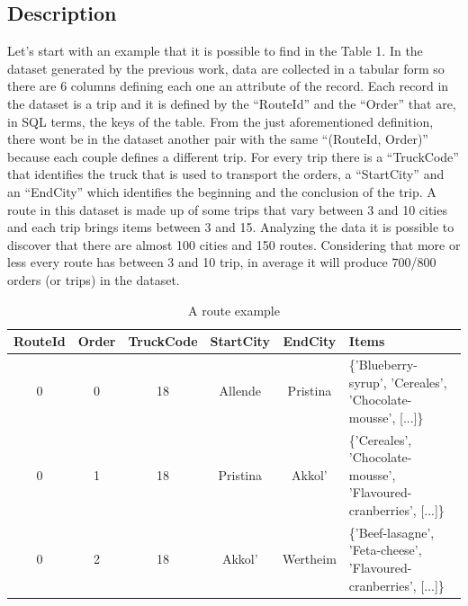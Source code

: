 \documentclass{acm_proc_article-sp-sigmod09}
\begin{document}
	\subsection{Description}
	Let's start with an example that it is possible to find in the Table 1.
	In the dataset generated by the previous work, data are collected in a tabular form so there are 6 columns defining each one an attribute of the record.
	Each record in the dataset is a trip and it is defined by the ``RouteId'' and the ``Order'' that are, in SQL terms, the keys of the table. From the just aforementioned definition, there wont be in the dataset another pair with the same ``(RouteId, Order)'' because each couple defines a different trip. 
	For every trip there is a ``TruckCode'' that identifies the truck that is used to transport the orders, a ``StartCity'' and an ``EndCity'' which identifies the beginning and the conclusion of the trip.
	A route in this dataset is made up of some trips that vary between 3 and 10 cities and each trip brings items between 3 and 15.
	Analyzing the data it is possible to discover that there are almost 100 cities and 150 routes. Considering that more or less every route has between 3 and 10 trip, in average it will produce 700/800 orders (or trips) in the dataset.
	\begin{table}
		\centering
		\caption{A route example}
		\begin{tabular}{|c|c|c|c|c|p{7cm}|} \hline
			\textbf{RouteId}&\textbf{Order}&\textbf{TruckCode}&\textbf{StartCity}&\textbf{EndCity}&\textbf{Items}\\ \hline
			0&0&18&Allende&Pristina&\{'Blueberry-syrup',
				'Cereales',
				'Chocolate-mousse', [...]\}\\ \hline
			0&1&18&Pristina&Akkol'&\{'Cereales',
				'Chocolate-mousse',
				'Flavoured-cranberries', [...]\}\\ \hline
			0&2&18&Akkol'&Wertheim&\{'Beef-lasagne',
				'Feta-cheese',
				'Flavoured-cranberries', [...]\}\\ \hline
			\end{tabular}
	\end{table}
	
\end{document}
